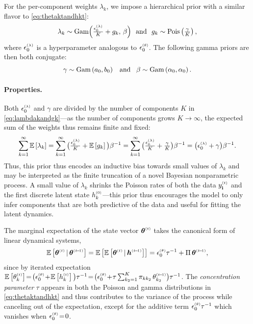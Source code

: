 \documentclass{article}
\begin{document}
For the per-component weights $\lambda_k$, we impose a hierarchical prior with a similar flavor to \cref{eq:thetaktandhkt}:~ 
\begin{equation}
\label{eq:lambdakandgk}
\lambda_k \sim \textrm{Gam}\Big(\tfrac{\epslambda}{K} + g_k,\, \beta\Big) \,\,\textrm{ and }\,\,g_k \sim \Pois{\tfrac{\gamma}{K}},
% 
\end{equation}
where $\epslambda$ is a hyperparameter analogous to $\epstheta$. The following gamma priors are then both conjugate:~
\begin{equation}
\gamma \sim \textrm{Gam}\left( a_0,b_0 \right) \,\,\,\textrm{ and }\,\,\, \beta \sim \textrm{Gam}\left( \alpha_0, \alpha_0 \right).
\end{equation}
\paragraph{Properties.}
Both $\epslambda$ and $\gamma$ are divided by the number of components $K$ in \cref{eq:lambdakandgk}---as the number of components grows $K \!\rightarrow\! \infty$, the expected sum of the weights thus remains finite and fixed:~
\begin{equation}
\sum_{k=1}^\infty \E{\lambda_k} = \sum_{k=1}^\infty \big(\tfrac{\epslambda}{K} + \E{g_k}\big) \beta^{-1} = \sum_{k=1}^\infty \big(\tfrac{\epslambda}{K} + \tfrac{\gamma}{K} \big)\beta^{-1} = \big(\epslambda + \gamma \big)\beta^{-1}.
\end{equation}
Thus, this prior thus encodes an inductive bias towards small values of $\lambda_k$ and may be interpreted as the finite truncation of a novel Bayesian nonparametric process. A small value of $\lambda_k$ shrinks the Poisson rates of both the data $\ydt$ and the first discrete latent state $h^{\mathsmaller{(0)}}_k$---this prior thus encourages the model to only infer components that are both predictive of the data and useful for fitting the latent dynamics.~


The marginal expectation of the state vector $\boldsymbol{\theta}^{\mathsmaller{(t)}}$ takes the canonical form of linear dynamical systems,~
\begin{align}
\mathbb{E}\left[\boldsymbol{\theta}^{\mathsmaller{(t)}} \given \boldsymbol{\theta}^{\mathsmaller{(t \tm 1)}}\right] = \mathbb{E}\left[\mathbb{E}\left[\boldsymbol{\theta}^{\mathsmaller{(t)}} \given \boldsymbol{h}^{\mathsmaller{(t \tm 1)}}\right]\right] = \epstheta \tau^{-1} + \Pi \, \boldsymbol{\theta}^{\mathsmaller{(t \tm 1)}},
\end{align}
since by iterated expectation $\E{\thetakt} \teq \big(\epstheta \tp \E{\hkt}\big)\tau^{-1} \teq \big(\epstheta \tp \tau \sum_{k_2 = 1}^K \pi_{kk_2} \,\thetakttm \big) \tau^{-1}$. The \emph{concentration parameter} $\tau$ appears in both the Poisson and gamma distributions in \cref{eq:thetaktandhkt} and thus contributes to the variance of the process while canceling out of the expectation, except for the additive term $\epstheta \tau^{-1}$ which vanishes when $\epstheta \teq 0$.
\end{document}
